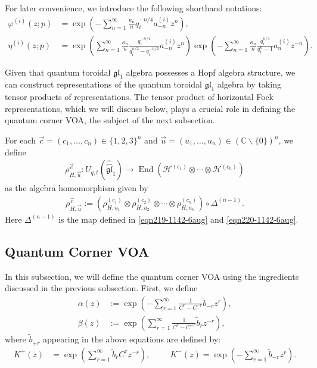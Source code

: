 \documentclass[12pt,reqno,a4paper]{amsart}
\newcommand{\comp}{\circ}
\newcommand{\tens}{\otimes}
\newcommand{\cals}[1]{\mathcal{#1}}
\newcommand{\fraks}[1]{\mathfrak{#1}}
\newcommand{\bb}[1]{\mathbb{#1}}
\numberwithin{equation}{section}
\theoremstyle{definition}
\begin{document}
For later convenience, we introduce the following shorthand notations:
\begin{align}
	\varphi^{(i)}(z;p) &= 
	\exp\left(
	- \sum_{n = 1}^{\infty}
	\frac{\kappa_n}{n}q^{-n/4}_{i}
	a^{(i)}_{-n}z^n
	\right),
	\\
	\eta^{(i)}(z;p) &= 
	\exp\left(
	\sum_{n = 1}^{\infty}
	\frac{\kappa_n}{n}
	\frac{q^{-n/4}_{i}}{q^{n/2}_{i} - q^{-n/2}_{i}}
	a^{(i)}_{-n}z^n
	\right)
	\exp\left(
	-\sum_{n = 1}^{\infty}
	\frac{\kappa_n}{n}
	\frac{q^{n/4}_{i}}{q^{n}_{i}  - 1}
	a^{(i)}_{n}z^{-n}
	\right). 
\end{align}

Given that quantum toroidal $\fraks{gl}_1$ algebra possesses a Hopf algebra structure, we can construct representations of the quantum toroidal $\fraks{gl}_1$ algebra by taking tensor products of representations. The tensor product of horizontal Fock representations, which we will discuss below, plays a crucial role in defining the quantum corner VOA, the subject of the next subsection. 

For each $\vec{c} = (c_1,\dots,c_n) \in \{1,2,3\}^n$ and $\vec{u} = (u_1,\dots,u_n) \in (\bb{C}\backslash\{0\})^n$, we define 
\begin{align}
	\rho^{\vec{c}}_{H,\vec{u}}
	: 
	U_{q,t}(\widehat{\widehat{\fraks{gl}}}_1)
	\rightarrow \operatorname{End}(\cals{H}^{(c_1)} \tens \cdots \tens \cals{H}^{(c_n)})
\end{align}
as the algebra homomorphism given by 
\begin{align}
	\rho^{\vec{c}}_{H,\vec{u}}
	:= 
	\left(
	\rho_{H,u_1}^{(c_1)} \tens \rho_{H,u_2}^{(c_2)} \tens \cdots \tens \rho_{H,u_n}^{(c_n)}	
	\right) \comp 
	\Delta^{(n-1)}. 
\label{eqn231-1209-6aug}
\end{align}
Here $\Delta^{(n-1)}$ is the map defined in \eqref{eqn219-1142-6aug} and \eqref{eqn220-1142-6aug}. 






\subsection{Quantum Corner VOA}

In this subsection, we will define the quantum corner VOA using the ingredients discussed in the previous subsection. First, we define 
\begin{align}
	\alpha(z) &:= 
	\exp\left(
	-\sum_{r = 1}^{\infty}\frac{1}{C^r - C^{-r}}\widetilde{b}_{-r}z^r
	\right),
	\\
	\beta(z) &:=
	\exp\left(
	\sum_{r = 1}^{\infty}\frac{1}{C^r - C^{-r}}\widetilde{b}_rz^{-r}
	\right),
\end{align}
where $\widetilde{b}_{\pm r}$ appearing in the above equations are defined by:
\begin{align}
	K^+(z) &= 
	\exp\left(
	\sum_{r = 1}^{\infty}\widetilde{b}_rC^{r}z^{-r}
	\right),
	\hspace{1cm}
	K^-(z) =
	\exp\left(
	-\sum_{r = 1}^{\infty}\widetilde{b}_{-r}z^r
	\right). 
\end{align}
\end{document}
